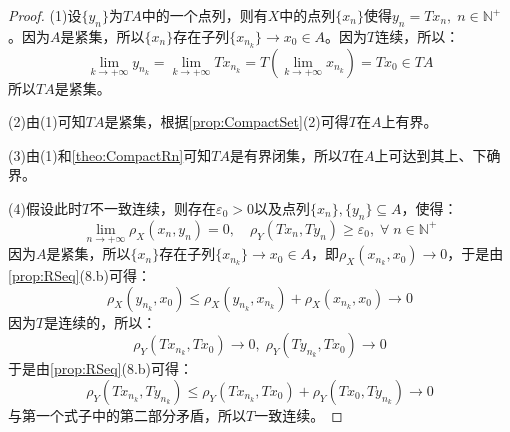 \begin{proof}
	(1)设$\{y_n\}$为$TA$中的一个点列，则有$X$中的点列$\{x_n\}$使得$y_n=Tx_n,\;n\in\mathbb{N}^+$。因为$A$是紧集，所以$\{x_n\}$存在子列$\{x_{n_k}\}\to x_0\in A$。因为$T$连续，所以：
	\begin{equation*}
		\lim_{k\to+\infty}y_{n_k}=\lim_{k\to+\infty}Tx_{n_k}=T\left(\lim_{k\to+\infty}x_{n_k}\right)=Tx_0\in TA
	\end{equation*}
	所以$TA$是紧集。\par
	(2)由(1)可知$TA$是紧集，根据\cref{prop:CompactSet}(2)可得$T$在$A$上有界。\par
	(3)由(1)和\cref{theo:CompactRn}可知$TA$是有界闭集，所以$T$在$A$上可达到其上、下确界。\par
	(4)假设此时$T$不一致连续，则存在$\varepsilon_0>0$以及点列$\{x_n\},\{y_n\}\subseteq A$，使得：
	\begin{equation*}
		\lim_{n\to+\infty}\rho_X(x_n,y_n)=0,\quad\rho_Y(Tx_n,Ty_n)\geqslant\varepsilon_0,\;\forall\;n\in\mathbb{N}^+
	\end{equation*}
	因为$A$是紧集，所以$\{x_n\}$存在子列$\{x_{n_k}\}\to x_0\in A$，即$\rho_X(x_{n_k},x_0)\to 0$，于是由\cref{prop:RSeq}(8.b)可得：
	\begin{equation*}
		\rho_X(y_{n_k},x_0)\leqslant\rho_X(y_{n_k},x_{n_k})+\rho_X(x_{n_k},x_0)\to0
	\end{equation*}
	因为$T$是连续的，所以：
	\begin{equation*}
		\rho_Y(Tx_{n_k},Tx_0)\to0,\;\rho_Y(Ty_{n_k},Tx_0)\to0
	\end{equation*}
	于是由\cref{prop:RSeq}(8.b)可得：
	\begin{equation*}
		\rho_Y(Tx_{n_k},Ty_{n_k})\leqslant\rho_Y(Tx_{n_k},Tx_0)+\rho_Y(Tx_0,Ty_{n_k})\to 0
	\end{equation*}
	与第一个式子中的第二部分矛盾，所以$T$一致连续。
\end{proof}

